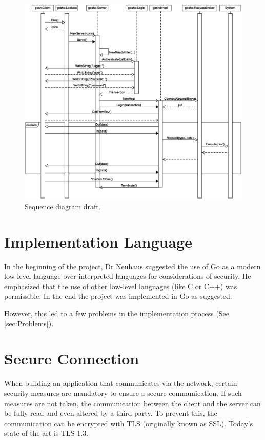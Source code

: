 \documentclass[10pt,a4paper,titlepage,twoside,english,final]{zhawreprt}
\begin{document}
\begin{figure}[ht]
\includegraphics[width=\textwidth]{SequenceDiagram}
\caption{Sequence diagram draft.}
\label{fig:SeqDiaOriginal}
\end{figure}


\section{Implementation Language}\label{sec:DesignImplementationLanguage}
In the beginning of the project, Dr Neuhaus suggested the use of \gls{Go} as a modern low-level language over interpreted languages for considerations of security.
He emphasized that the use of other low-level languages (like \gls{C} or \gls{C++}) was permissible.
In the end the project was implemented in \gls{Go} as suggested.

However, this led to a few problems in the implementation process (See \ref{sec:Problems}).

\section{Secure Connection}\label{sec:DesignSecureConnection}
When building an application that communicates via the network, certain security measures are mandatory to ensure a secure communication.
If such measures are not taken, the communication between the client and the server can be fully read and even altered by a third party.
To prevent this, the communication can be encrypted with \gls{TLS} (originally known as \gls{SSL}).
Today's state-of-the-art is \gls{TLS} 1.3\citep{rfc8446}.
\end{document}
